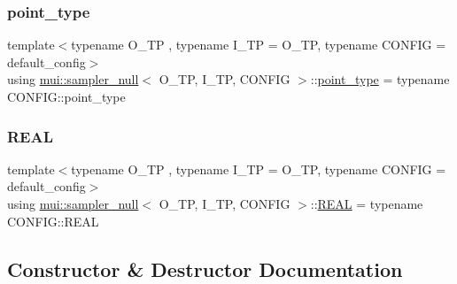 \mbox{\label{classmui_1_1sampler__null_a985eebd74be60f0c554d6ab50914e99b}} 
\subsubsection{\texorpdfstring{point\+\_\+type}{point\_type}}
{\footnotesize\ttfamily template$<$typename O\+\_\+\+TP , typename I\+\_\+\+TP  = O\+\_\+\+TP, typename C\+O\+N\+F\+IG  = default\+\_\+config$>$ \\
using \hyperlink{classmui_1_1sampler__null}{mui\+::sampler\+\_\+null}$<$ O\+\_\+\+TP, I\+\_\+\+TP, C\+O\+N\+F\+IG $>$\+::\hyperlink{classmui_1_1sampler__null_a985eebd74be60f0c554d6ab50914e99b}{point\+\_\+type} =  typename C\+O\+N\+F\+I\+G\+::point\+\_\+type}

\mbox{\label{classmui_1_1sampler__null_a00fccc2bca221ca91668d49c771b33bc}} 
\subsubsection{\texorpdfstring{R\+E\+AL}{REAL}}
{\footnotesize\ttfamily template$<$typename O\+\_\+\+TP , typename I\+\_\+\+TP  = O\+\_\+\+TP, typename C\+O\+N\+F\+IG  = default\+\_\+config$>$ \\
using \hyperlink{classmui_1_1sampler__null}{mui\+::sampler\+\_\+null}$<$ O\+\_\+\+TP, I\+\_\+\+TP, C\+O\+N\+F\+IG $>$\+::\hyperlink{classmui_1_1sampler__null_a00fccc2bca221ca91668d49c771b33bc}{R\+E\+AL} =  typename C\+O\+N\+F\+I\+G\+::\+R\+E\+AL}



\subsection{Constructor \& Destructor Documentation}
\mbox{\label{classmui_1_1sampler__null_a4f70aa0cd24e004528d8899568e12b5a}} 
